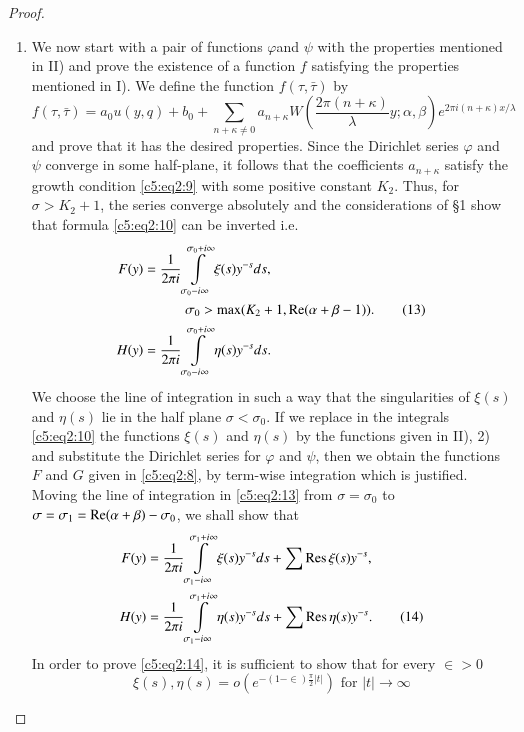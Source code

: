 \begin{proof}
\begin{enumerate}
\item We now start with a pair of functions $\varphi$and $\psi$ with
  the properties mentioned in II) and prove the existence of a
  function $f$ satisfying the properties mentioned in I). We define
  the function $f(\tau,\bar{\tau})$ by 
$$
f(\tau,\bar{\tau}) =a_0 u(y,q) + b_0 + \sum_{n+\kappa \neq 0}
a_{n+\kappa} W(\frac{2\pi (n+\kappa)}{\lambda} y;\alpha,\beta) e^{2\pi
i(n+\kappa)x/\lambda}
$$
and prove that it has the desired properties. Since the Dirichlet
series $\varphi$ and $\psi$ converge in some half-plane, it follows
that the coefficients $a_{n+\kappa}$ satisfy the growth condition \eqref{c5:eq2:9}
with some positive constant $K_2$. Thus, for $\sigma>K_2+1$, the
series converge absolutely and the considerations of \S 1 show that
formula \eqref{c5:eq2:10} can be inverted i.e.
\begin{align*}
F(y) & = \frac{1}{2\pi i}
\int\limits^{\sigma_0+i\infty}_{\sigma_0-i\infty} \xi(s) y^{-s} ds,\\
& \quad \qquad \sigma_0 >\max (K_2+1, \operatorname{Re}
(\alpha+\beta-1)). \tag{13}\label{c5:eq2:13}\\
H(y) & = \frac{1}{2\pi i}
\int\limits^{\sigma_0+i\infty}_{\sigma_0-i\infty} \eta(s) y^{-s} ds.
\end{align*}\pageoriginale
We choose the line of integration in such a way that the singularities
of $\xi(s)$ and $\eta(s)$ lie in the half plane $\sigma<\sigma_0$. If
we replace in the integrals \eqref{c5:eq2:10} the functions $\xi(s)$ and $\eta(s)$
by the functions given in II), 2) and substitute the Dirichlet series
for $\varphi$ and $\psi$, then we obtain the functions $F$ and $G$
given in \eqref{c5:eq2:8}, by term-wise integration which is justified. Moving the
line of integration in \eqref{c5:eq2:13} from $\sigma=\sigma_0$ to
$\sigma=\sigma_1=\operatorname{Re} (\alpha+\beta)-\sigma_0$, we shall show that 
\begin{align*}
F(y) & = \frac{1}{2\pi i}
\int\limits^{\sigma_1+i\infty}_{\sigma_1-i\infty} \xi(s) y^{-s} ds+
\sum \operatorname{Res} \xi(s) y^{-s},\\
H(y) & = \frac{1}{2\pi i}
\int\limits^{\sigma_1+i\infty}_{\sigma_1-i\infty} \eta(s) y^{-s} ds +
\sum \operatorname{Res} \eta(s) y^{-s}. \tag{14}\label{c5:eq2:14}
\end{align*}
In order to prove \eqref{c5:eq2:14}, it is sufficient to show that for every
$\in >0$ 
\begin{equation*}
\xi(s),\eta(s) = o (e^{-(1-\in)\frac{\pi}{2}|t|}) \text{ for }
|t| \to \infty \tag{15}\label{c5:eq2:15}
\end{equation*}

\end{enumerate}
\end{proof}
